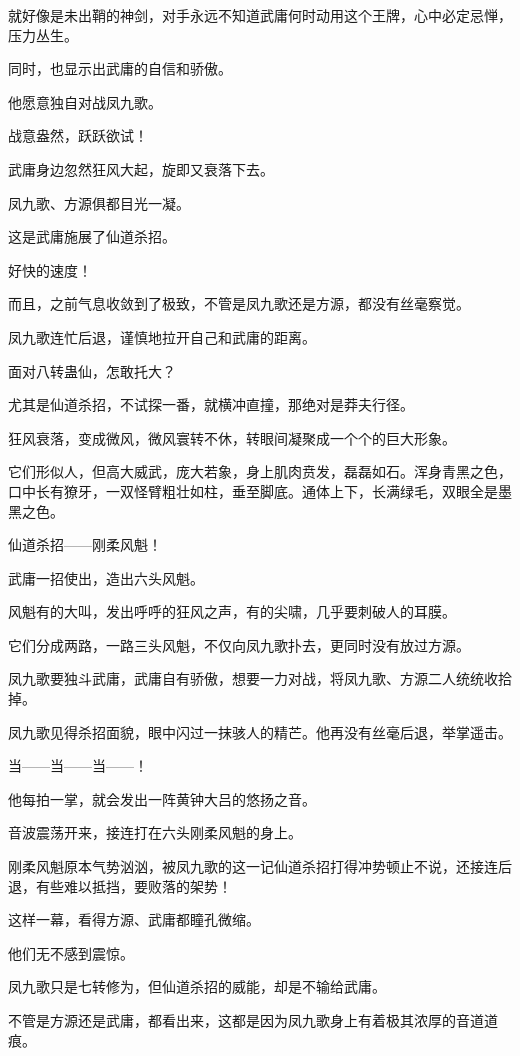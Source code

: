 \begin{this_body}
就好像是未出鞘的神剑，对手永远不知道武庸何时动用这个王牌，心中必定忌惮，压力丛生。

同时，也显示出武庸的自信和骄傲。

他愿意独自对战凤九歌。

战意盎然，跃跃欲试！

武庸身边忽然狂风大起，旋即又衰落下去。

凤九歌、方源俱都目光一凝。

这是武庸施展了仙道杀招。

好快的速度！

而且，之前气息收敛到了极致，不管是凤九歌还是方源，都没有丝毫察觉。

凤九歌连忙后退，谨慎地拉开自己和武庸的距离。

面对八转蛊仙，怎敢托大？

尤其是仙道杀招，不试探一番，就横冲直撞，那绝对是莽夫行径。

狂风衰落，变成微风，微风寰转不休，转眼间凝聚成一个个的巨大形象。

它们形似人，但高大威武，庞大若象，身上肌肉贲发，磊磊如石。浑身青黑之色，口中长有獠牙，一双怪臂粗壮如柱，垂至脚底。通体上下，长满绿毛，双眼全是墨黑之色。

仙道杀招——刚柔风魁！

武庸一招使出，造出六头风魁。

风魁有的大叫，发出呼呼的狂风之声，有的尖啸，几乎要刺破人的耳膜。

它们分成两路，一路三头风魁，不仅向凤九歌扑去，更同时没有放过方源。

凤九歌要独斗武庸，武庸自有骄傲，想要一力对战，将凤九歌、方源二人统统收拾掉。

凤九歌见得杀招面貌，眼中闪过一抹骇人的精芒。他再没有丝毫后退，举掌遥击。

当——当——当——！

他每拍一掌，就会发出一阵黄钟大吕的悠扬之音。

音波震荡开来，接连打在六头刚柔风魁的身上。

刚柔风魁原本气势汹汹，被凤九歌的这一记仙道杀招打得冲势顿止不说，还接连后退，有些难以抵挡，要败落的架势！

这样一幕，看得方源、武庸都瞳孔微缩。

他们无不感到震惊。

凤九歌只是七转修为，但仙道杀招的威能，却是不输给武庸。

不管是方源还是武庸，都看出来，这都是因为凤九歌身上有着极其浓厚的音道道痕。


\end{this_body}
